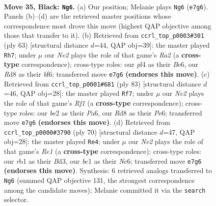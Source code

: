 \documentclass[11pt]{article}
\begin{document}
\clearpage

\begin{figure}[p]\centering
\begin{subfigure}{0.46\textwidth}\centering
\resizebox{\linewidth}{!}{%
\newchessgame
\chessboard[
  setfen={3r2k1/p3n3/Pp5b/5p2/4pP2/8/4B3/1RB1K3 b - - 3 35},
  showmover=false,
  pgfstyle=straightmove, color=movearrow, markmove={e7-g6}
]}
\caption{}
\end{subfigure}\hfill
\begin{subfigure}{0.46\textwidth}\centering
\resizebox{\linewidth}{!}{%
\newchessgame
\chessboard[
  setfen={4k3/r7/1pp1bB1P/p1n5/P7/2P5/8/4RBK1 b - - 0 32},
  showmover=false,
  pgfstyle=straightmove, color=movearrow, markmove={a7-h7}
]}
\caption{}
\end{subfigure}
\\[4pt]
\begin{subfigure}{0.46\textwidth}\centering
\resizebox{\linewidth}{!}{%
\newchessgame
\chessboard[
  setfen={5r2/1p5R/p1p1pk2/8/PP2BbP1/3P4/4K3/8 b - - 0 42},
  showmover=false,
  pgfstyle=straightmove, color=movearrow, markmove={f8-f7}
]}
\caption{}
\end{subfigure}\hfill
\begin{subfigure}{0.46\textwidth}\centering
\resizebox{\linewidth}{!}{%
\newchessgame
\chessboard[
  setfen={6rk/7p/2Np4/3P4/5b2/1P1B3b/1P5P/1K2R3 w - - 3 36},
  showmover=false,
  pgfstyle=straightmove, color=movearrow, markmove={e1-e4}
]}
\caption{}
\end{subfigure}
\caption{\textbf{Move 35, Black: \texttt{Ng6}.} (a) Our position; Melanie plays \texttt{Ng6} (\texttt{e7g6}). Panels (b)--(d) are the retrieved master positions whose correspondence most drove this move (highest QAP objective among those that transfer to it). (b) Retrieved from \texttt{ccrl\_top\_p0003\#301} (ply 63) [structural distance $d$=44, QAP obj=39]: the master played \texttt{Rh7}; under $\mu$ our \emph{Ne2} plays the role of that game's \emph{Ra2} (a \textbf{cross-type} correspondence); cross-type roles: our \emph{p}f4 as their \emph{B}e6, our \emph{R}d8 as their \emph{b}f6; transferred move \texttt{e7g6} \textbf{(endorses this move)}. (c) Retrieved from \texttt{ccrl\_top\_p0001\#681} (ply 83) [structural distance $d$=46, QAP obj=28]: the master played \texttt{Rf7}; under $\mu$ our \emph{Ne2} plays the role of that game's \emph{Rf1} (a \textbf{cross-type} correspondence); cross-type roles: our \emph{b}e2 as their \emph{P}a6, our \emph{R}d8 as their \emph{P}e6; transferred move \texttt{e7g6} \textbf{(endorses this move)}. (d) Retrieved from \texttt{ccrl\_top\_p0000\#3790} (ply 70) [structural distance $d$=47, QAP obj=28]: the master played \texttt{Re4}; under $\mu$ our \emph{Ne2} plays the role of that game's \emph{Re1} (a \textbf{cross-type} correspondence); cross-type roles: our \emph{r}b1 as their \emph{B}d3, our \emph{b}c1 as their \emph{N}c6; transferred move \texttt{e7g6} \textbf{(endorses this move)}. Synthesis: 6 retrieved analogs transferred to \texttt{Ng6} (summed QAP objective 131, the strongest correspondence among the candidate moves); Melanie committed it via the \texttt{search} selector.}
\label{fig:thought-m69}
\end{figure}
\end{document}
